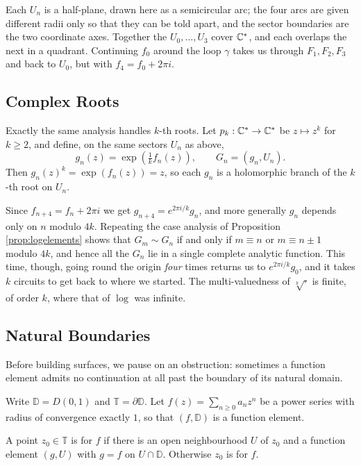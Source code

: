 \documentclass[a4paper]{scrartcl}
\newcommand{\disc}{\mathbb{D}}
\newcommand{\Cs}{\C^*}
\begin{document}
Each $U_n$ is a half-plane, drawn here as a semicircular arc; the four arcs are given
different radii only so that they can be told apart, and the sector boundaries are the
two coordinate axes. Together the $U_0, \dots, U_3$ cover $\Cs$, and each overlaps the
next in a quadrant. Continuing $f_0$ around the loop $\gamma$ takes us through
$F_1, F_2, F_3$ and back to $U_0$, but with $f_4 = f_0 + 2\pi i$.

\subsection{Complex Roots}

Exactly the same analysis handles $k$-th roots. Let $p_k : \Cs \to \Cs$ be $z \mapsto z^k$
for $k \geq 2$, and define, on the same sectors $U_n$ as above,
$$
g_n(z) = \exp\left(\tfrac{1}{k} f_n(z)\right), \qquad G_n = (g_n, U_n).
$$
Then $g_n(z)^k = \exp(f_n(z)) = z$, so each $g_n$ is a holomorphic branch of the $k$-th
root on $U_n$.

Since $f_{n + 4}= f_n + 2\pi i$ we get $g_{n+4} = e^{2\pi i /k} g_n$, and more generally
$g_n$ depends only on $n$ modulo $4k$. Repeating the case analysis of Proposition
\ref{prop:logelements} shows that $G_m \sim G_n$ if and only if $m \equiv n$ or
$m \equiv n \pm 1$ modulo $4k$, and hence all the $G_n$ lie in a single complete analytic
function. This time, though, going round the origin \emph{four} times returns us to
$e^{2\pi i / k}g_0$, and it takes $k$ circuits to get back to where we started. The
multi-valuedness of $\sqrt[k]{\cdot}$ is finite, of order $k$, where that of $\log$ was
infinite.

\subsection{Natural Boundaries}

Before building surfaces, we pause on an obstruction: sometimes a function element admits
no continuation at all past the boundary of its natural domain.

Write $\disc = D(0,1)$ and $\mathbb{T} = \partial \disc$. Let $f(z) = \sum_{n \geq 0} a_n z^n$
be a power series with radius of convergence exactly $1$, so that $(f, \disc)$ is a
function element.

\begin{definition}
	A point $z_0 \in \mathbb{T}$ is  for $f$ if there is an open
	neighbourhood $U$ of $z_0$ and a function element $(g, U)$ with $g = f$ on
	$U \cap \disc$. Otherwise $z_0$ is  for $f$.
\end{definition}
\end{document}
